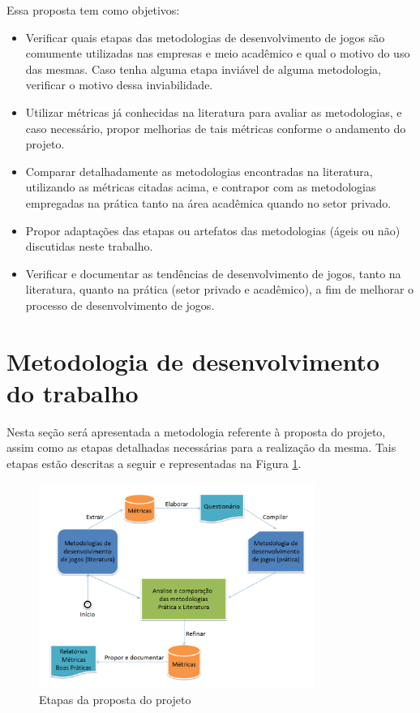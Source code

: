 \documentclass[quali]{ppgccufscar}
\begin{document}
Essa proposta tem como objetivos:

\begin{itemize}
	\item Verificar quais etapas das metodologias de desenvolvimento de jogos são comumente utilizadas nas empresas e meio acadêmico e qual o motivo do uso das mesmas. Caso tenha alguma etapa inviável de alguma metodologia, verificar o motivo dessa inviabilidade.
	\item Utilizar métricas já conhecidas na literatura para avaliar as metodologias, e caso necessário, propor melhorias de tais métricas conforme o andamento do projeto.
	\item Comparar detalhadamente as metodologias encontradas na literatura, utilizando as mé\-tri\-cas citadas acima, e contrapor com as metodologias empregadas na prática tanto na área acadêmica quando no setor privado.
	\item Propor adaptações das etapas ou artefatos das metodologias (ágeis ou não) discutidas neste trabalho.
	\item Verificar e documentar as tendências de desenvolvimento de jogos, tanto na literatura, quanto na prática (setor privado e acadêmico), a fim de melhorar o processo de desenvolvimento de jogos.
\end{itemize}


\section{Metodologia de desenvolvimento do trabalho}
\label{sec_proposta}

Nesta seção será apresentada a metodologia referente à proposta do projeto, assim como as etapas detalhadas necessárias para a realização da mesma. Tais etapas estão descritas a seguir e representadas na Figura \ref{fig_proposta}. 

\begin{figure}[!htbp]
	\begin{center}
	\caption{Etapas da proposta do projeto}
	\label{fig_proposta}
	\includegraphics[width=0.8\textwidth,natwidth=1060,natheight=790]{figura6.jpg}
	\end{center}
\end{figure}
\end{document}
